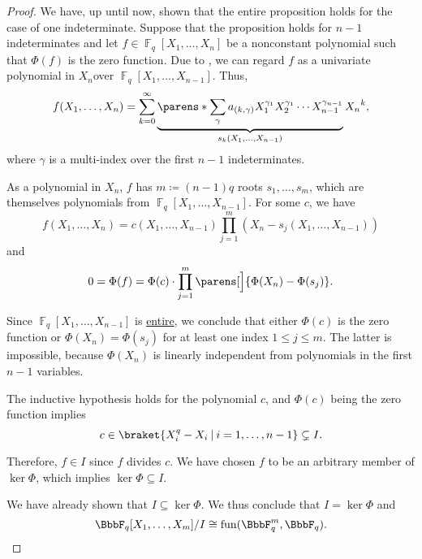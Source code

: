 \begin{proof}
  We have, up until now, shown that the entire proposition holds for the case of one indeterminate. Suppose that the proposition holds for \( n - 1 \) indeterminates and let \( f \in \BbbF_q[X_1, \ldots, X_n] \) be a nonconstant polynomial such that \( \Phi(f) \) is the zero function. Due to , we can regard \( f \) as a univariate polynomial in \( X_n \)over \( \BbbF_q[X_1, \ldots, X_{n-1}] \). Thus,
  \begin{equation*}
    f(X_1, \ldots, X_n) = \sum_{k=0}^\infty \underbrace{\parens*{ \sum_\gamma a_{(k,\gamma)} X_1^{\gamma_1} X_2^{\gamma_1} \cdots X_{n-1}^{\gamma_{n-1}} }}_{s_k(X_1, \ldots, X_{n-1})} {X_n}^k,
  \end{equation*}
  where \( \gamma \) is a multi-index over the first \( n - 1 \) indeterminates.

  As a polynomial in \( X_n \), \( f \) has \( m \coloneqq (n-1)q \) roots \( s_1, \ldots, s_m \), which are themselves polynomials from \( \BbbF_q[X_1, \ldots, X_{n-1}] \). For some \( c \), we have
  \begin{equation*}
    f(X_1, \ldots, X_n) = c(X_1, \ldots, X_{n-1}) \prod_{j=1}^m (X_n - s_j(X_1, \ldots, X_{n-1}))
  \end{equation*}
  and
  \begin{equation*}
    0 = \Phi(f) = \Phi(c) \cdot \prod_{j=1}^m \parens[\Big]{ \Phi(X_n) - \Phi(s_j) }.
  \end{equation*}

  Since \( \BbbF_q[X_1, \ldots, X_{n-1}] \) is \hyperref[def:entire_semiring]{entire}, we conclude that either \( \Phi(c) \) is the zero function or \( \Phi(X_n) = \Phi(s_j) \) for at least one index \( 1 \leq j \leq m \). The latter is impossible, because \( \Phi(X_n) \) is linearly independent from polynomials in the first \( n - 1 \) variables.

  The inductive hypothesis holds for the polynomial \( c \), and \( \Phi(c) \) being the zero function implies
  \begin{equation*}
    c \in \braket{ X_i^q - X_i \given i = 1, \ldots, n - 1 } \subsetneq I.
  \end{equation*}

  Therefore, \( f \in I \) since \( f \) divides \( c \). We have chosen \( f \) to be an arbitrary member of \( \ker \Phi \), which implies \( \ker \Phi \subseteq I \).

  We have already shown that \( I \subseteq \ker \Phi \). We thus conclude that \( I = \ker \Phi \) and
  \begin{equation*}
    \BbbF_q[X_1, \ldots, X_m] / I \cong \fun(\BbbF_q^m, \BbbF_q).
  \end{equation*}
\end{proof}

